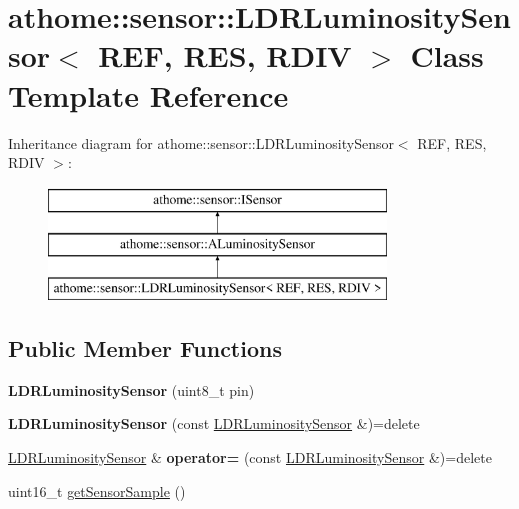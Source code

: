 \hypertarget{classathome_1_1sensor_1_1_l_d_r_luminosity_sensor}{}\section{athome\+:\+:sensor\+:\+:L\+D\+R\+Luminosity\+Sensor$<$ R\+EF, R\+ES, R\+D\+IV $>$ Class Template Reference}
\label{classathome_1_1sensor_1_1_l_d_r_luminosity_sensor}
Inheritance diagram for athome\+:\+:sensor\+:\+:L\+D\+R\+Luminosity\+Sensor$<$ R\+EF, R\+ES, R\+D\+IV $>$\+:\begin{figure}[H]
\begin{center}
\leavevmode
\includegraphics[height=3.000000cm]{classathome_1_1sensor_1_1_l_d_r_luminosity_sensor}
\end{center}
\end{figure}
\subsection*{Public Member Functions}
\begin{DoxyCompactItemize}
\item 
\mbox{\label{classathome_1_1sensor_1_1_l_d_r_luminosity_sensor_aee1ab68d020e97e6ec526a4b11e6f4fc}} 
{\bfseries L\+D\+R\+Luminosity\+Sensor} (uint8\+\_\+t pin)
\item 
\mbox{\label{classathome_1_1sensor_1_1_l_d_r_luminosity_sensor_a7a3c5ffb280c13acdcd5444963f7a32f}} 
{\bfseries L\+D\+R\+Luminosity\+Sensor} (const \mbox{\hyperlink{classathome_1_1sensor_1_1_l_d_r_luminosity_sensor}{L\+D\+R\+Luminosity\+Sensor}} \&)=delete
\item 
\mbox{\label{classathome_1_1sensor_1_1_l_d_r_luminosity_sensor_ab9e7d3d92fb16c7464d7a2f6c39a42fa}} 
\mbox{\hyperlink{classathome_1_1sensor_1_1_l_d_r_luminosity_sensor}{L\+D\+R\+Luminosity\+Sensor}} \& {\bfseries operator=} (const \mbox{\hyperlink{classathome_1_1sensor_1_1_l_d_r_luminosity_sensor}{L\+D\+R\+Luminosity\+Sensor}} \&)=delete
\item 
uint16\+\_\+t \mbox{\hyperlink{classathome_1_1sensor_1_1_l_d_r_luminosity_sensor_a6e4f25000704564ce30a7e3531f23c43}{get\+Sensor\+Sample}} ()
\end{DoxyCompactItemize}
